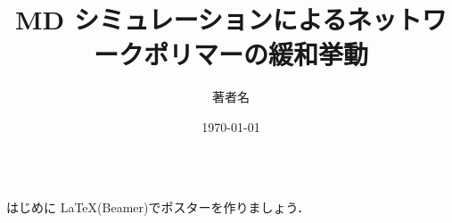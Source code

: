 \documentclass[final,dvipdfmx]{beamer}
\title{MD シミュレーションによるネットワークポリマーの緩和挙動}
\author{著者名}
\institute{東亞合成株式会社 hiroshi\_sasaki@toagosei.co.jp}
\date{\today}
\begin{document}
\begin{frame}
\begin{columns}[t]
    \begin{column}{.32\linewidth}
        \begin{block}{はじめに}
            \LaTeX{}(Beamer)でポスターを作りましょう．
        \end{block}
    \end{column}
\end{columns}
\end{frame}
\end{document}
